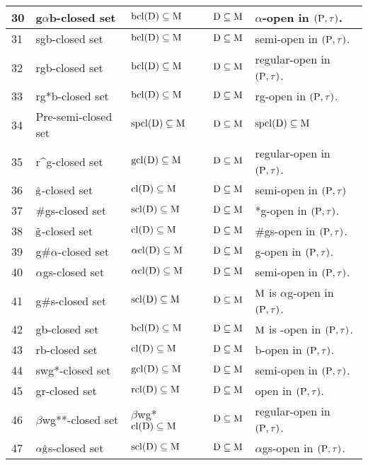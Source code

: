 {\begin{longtable}{@{}|p{.9cm}|>{\raggedright}p{5cm}|>{\centering}p{2.5cm}|>{\centering}p{1.7cm}|>{\centering}p{2.8cm}|@{}}
\hline
30 & g$\alpha$b-closed set \cite{Nagaveni7} & $\mathrm{bcl}(\mathrm{D}) \subseteq \mathrm{M}$ & $\mathrm{D} \subseteq \mathrm{M}$ & $\alpha$-open in $(\mathrm{P}, \tau)$.\tabularnewline
\hline
31 & sgb-closed set \cite{Nagaveni7} & $\mathrm{bcl}(\mathrm{D}) \subseteq \mathrm{M}$ & $\mathrm{D} \subseteq \mathrm{M}$ & semi-open in $(\mathrm{P}, \tau)$.\tabularnewline
\hline
32 & rgb-closed set \cite{Mariappa} & $\mathrm{bcl}(\mathrm{D}) \subseteq \mathrm{M}$ & $\mathrm{D} \subseteq \mathrm{M}$ & regular-open in $(\mathrm{P}, \tau)$.\tabularnewline
\hline
33 & rg*b-closed set \cite{Indirani} & $\mathrm{bcl}(\mathrm{D}) \subseteq \mathrm{M}$ & $\mathrm{D} \subseteq \mathrm{M}$ & rg-open in $(\mathrm{P}, \tau)$.\tabularnewline
\hline
34 & Pre-semi-closed set \cite{key} & $\mathrm{spcl}(\mathrm{D}) \subseteq \mathrm{M}$ & $\mathrm{D}\subseteq\mathrm{M}$ & $\mathrm{spcl}(\mathrm{D}) \subseteq \mathrm{M}$\tabularnewline
\hline
35 & r\textasciicircum{g}-closed set \cite{Janaki2} & $\mathrm{gcl}(\mathrm{D}) \subseteq \mathrm{M}$ & $\mathrm{D} \subseteq \mathrm{M}$ & regular-open in $(\mathrm{P}, \tau)$.\tabularnewline
\hline
36 & $\hat{\mathrm{g}}$-closed set \cite{VeeraKumar3} & $\mathrm{cl}(\mathrm{D}) \subseteq \mathrm{M}$ & $\mathrm{D} \subseteq \mathrm{M}$ & semi-open in $(\mathrm{P}, \tau)$\tabularnewline
\hline
37 & \#gs-closed set \cite{key} & $\mathrm{scl}(\mathrm{D}) \subseteq \mathrm{M}$ & $\mathrm{D} \subseteq \mathrm{M}$ & *g-open in $(\mathrm{P}, \tau)$.\tabularnewline
\hline
38 & $\tilde{\mathrm{g}}$-closed set \cite{key} & $\mathrm{cl}(\mathrm{D}) \subseteq \mathrm{M}$ & $\mathrm{D} \subseteq \mathrm{M}$ & \#gs-open in $(\mathrm{P}, \tau)$.\tabularnewline
\hline
39 & g\#$\alpha$-closed set \cite{Devi} & $\alpha\mathrm{cl}(\mathrm{D}) \subseteq \mathrm{M}$ & $\mathrm{D}\subseteq\mathrm{M}$ & g-open in $(\mathrm{P}, \tau)$.\tabularnewline
\hline
40 & $\alpha$gs-closed set \cite{Rajamani} & $\alpha\mathrm{cl}(\mathrm{D}) \subseteq \mathrm{M}$ & $\mathrm{D} \subseteq \mathrm{M}$ & semi-open in $(\mathrm{P}, \tau)$.\tabularnewline
\hline
41 & g\#s-closed set \cite{VeeraKumar1} & $\mathrm{scl}(\mathrm{D}) \subseteq \mathrm{M}$ & $\mathrm{D} \subseteq \mathrm{M}$ & $\mathrm{M}$ is $\alpha$g-open in $(\mathrm{P}, \tau)$.\tabularnewline
\hline
42 & gb-closed set \cite{Ahmad} & $\mathrm{bcl}(\mathrm{D}) \subseteq \mathrm{M}$ & $\mathrm{D} \subseteq \mathrm{M}$ & $\mathrm{M}$ is -open in $(\mathrm{P}, \tau)$.\tabularnewline
\hline
43 & rb-closed set \cite{Nagaveni2} & $\mathrm{cl}(\mathrm{D}) \subseteq \mathrm{M}$ & $\mathrm{D} \subseteq \mathrm{M}$ & b-open in $(\mathrm{P}, \tau)$.\tabularnewline
\hline
44 & swg*-closed set \cite{Nagaveni} & $\mathrm{gcl}(\mathrm{D}) \subseteq \mathrm{M}$ & $\mathrm{D} \subseteq \mathrm{M}$ & semi-open in $(\mathrm{P}, \tau)$.\tabularnewline
\hline
45 & gr-closed set \cite{Bhattacharya1} & $\mathrm{rcl}(\mathrm{D}) \subseteq \mathrm{M}$ & $\mathrm{D} \subseteq \mathrm{M}$ & open in $(\mathrm{P}, \tau)$.\tabularnewline
\hline
46 & $\beta$wg{*}{*}-closed set \cite{Subashini} & $\beta$wg*$\mathrm{cl}(\mathrm{D}) \subseteq \mathrm{M}$ & $\mathrm{D} \subseteq \mathrm{M}$ & regular-open in $(\mathrm{P}, \tau)$.\tabularnewline
\hline
47 & $\alpha\hat{\mathrm{g}}$s-closed set \cite{key} & $\mathrm{scl}(\mathrm{D}) \subseteq \mathrm{M}$ & $\mathrm{D} \subseteq \mathrm{M}$ & $\alpha$gs-open in $(\mathrm{P}, \tau)$.\tabularnewline

\end{longtable}}
